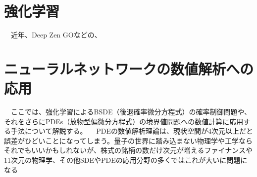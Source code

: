 \documentclass{jsarticle}
\begin{document}
\newpage
\section{強化学習}
　近年、Deep Zen GOなどの、

\newpage
\section{ニューラルネットワークの数値解析への応用}
　ここでは、強化学習によるBSDE（後退確率微分方程式）の確率制御問題や、それをさらにPDEs（放物型偏微分方程式）の境界値問題への数値計算に応用する手法について解説する。
　PDEの数値解析理論は、現状空間が4次元以上だと誤差がひどいことになってしまう。量子の世界に踏み込まない物理学や工学ならそれでもいいかもしれないが、株式の銘柄の数だけ次元が増えるファイナンスや11次元の物理学、その他SDEやPDEの応用分野の多くではこれが大いに問題になる\\
 
\end{document}
